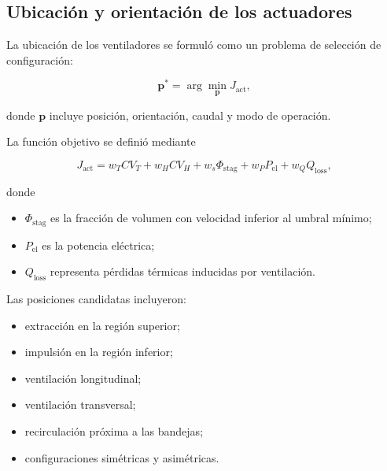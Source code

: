 \subsection{Ubicación y orientación de los actuadores}
\label{subsec:ubicacion_actuadores}

La ubicación de los ventiladores se formuló como un problema de selección de configuración:

\begin{equation}
\mathbf{p}^{*}
=
\arg\min_{\mathbf{p}}
J_{\mathrm{act}},
\label{eq:optimizacion_posicion_actuadores}
\end{equation}

donde $\mathbf{p}$ incluye posición, orientación, caudal y modo de operación.

La función objetivo se definió mediante

\begin{equation}
J_{\mathrm{act}}
=
w_T CV_T
+
w_H CV_H
+
w_s \Phi_{\mathrm{stag}}
+
w_P P_{\mathrm{el}}
+
w_Q Q_{\mathrm{loss}},
\label{eq:funcion_objetivo_actuadores}
\end{equation}

donde

\begin{itemize}
    \item $\Phi_{\mathrm{stag}}$ es la fracción de volumen con velocidad inferior al umbral mínimo;
    \item $P_{\mathrm{el}}$ es la potencia eléctrica;
    \item $Q_{\mathrm{loss}}$ representa pérdidas térmicas inducidas por ventilación.
\end{itemize}

Las posiciones candidatas incluyeron:

\begin{itemize}
    \item extracción en la región superior;
    \item impulsión en la región inferior;
    \item ventilación longitudinal;
    \item ventilación transversal;
    \item recirculación próxima a las bandejas;
    \item configuraciones simétricas y asimétricas.
\end{itemize}

